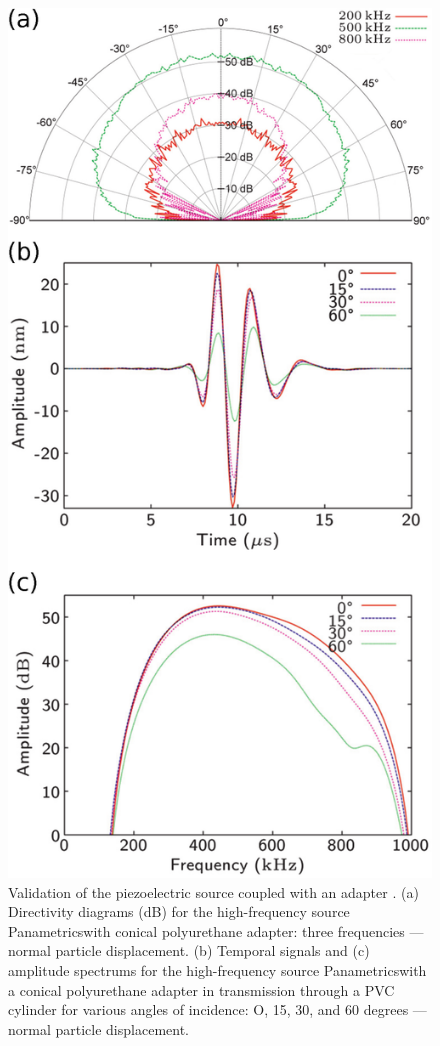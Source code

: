\documentclass[manuscript,revised]{geophysics}
\begin{document}
\begin{figure}[!ht]
	\centering
	\includegraphics[scale=0.5]{fig/piezo-source-validation.eps}
	\caption{Validation of the piezoelectric source coupled with an adapter \citep{Bretaudeau_SSM_2011}. (a) Directivity diagrams (dB) for the high-frequency source Panametrics\textregistered with conical polyurethane adapter: three frequencies — normal particle displacement. (b) Temporal signals and (c) amplitude spectrums for the high-frequency source Panametrics\textregistered with a conical polyurethane adapter in transmission through a PVC cylinder for	various angles of incidence: O, 15, 30, and 60 degrees — normal particle displacement.}
	\label{piezo-source-validation}
\end{figure}
\end{document}
